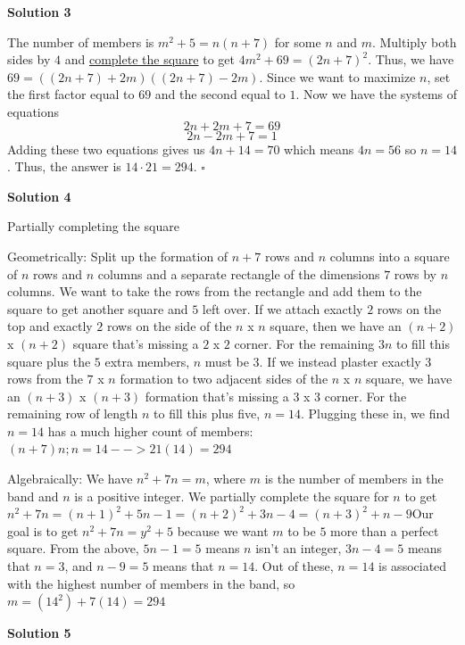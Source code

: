 \begin{enumerate}
 



\textbf{Solution 3}

The number of members is $m^2+5=n(n+7)$ for some $n$ and $m$. Multiply both sides by $4$ and \href{https://artofproblemsolving.com/wiki/index.php?title=Completing\_the\_square}{complete the square} to get $4m^2+69=(2n+7)^2$. Thus, we have $69=((2n+7)+2m)((2n+7)-2m)$. Since we want to maximize $n$, set the first factor equal to $69$ and the second equal to $1$. Now we have the systems of equations 
 \[2n+2m+7 = 69\]
 \[2n-2m+7 = 1\]Adding these two equations gives us $4n+14=70$ which means $4n=56$ so $n=14$. Thus, the answer is $14\cdot21=294$. $\square$




\textbf{Solution 4}

Partially completing the square

 Geometrically: Split up the formation of $n + 7$ rows and $n$ columns into a square of $n$ rows and $n$ columns and a separate rectangle of the dimensions $7$ rows by $n$ columns. We want to take the rows from the rectangle and add them to the square to get another square and $5$ left over. If we attach exactly $2$ rows on the top and exactly $2$ rows on the side of the $n$ x $n$ square, then we have an $(n + 2)$ x $(n + 2)$ square that's missing a $2$ x $2$ corner. For the remaining $3n$ to fill this square plus the $5$ extra members, $n$ must be $3$. If we instead plaster exactly $3$ rows from the $7$ x $n$ formation to two adjacent sides of the $n$ x $n$ square, we have an $(n + 3)$ x $(n + 3)$ formation that's missing a $3$ x $3$ corner. For the remaining row of length $n$ to fill this plus five, $n = 14$. Plugging these in, we find $n = 14$ has a much higher count of members: $(n + 7)n; n = 14 --> 21(14) = 294$

 Algebraically: We have $n^2 + 7n = m$, where $m$ is the number of members in the band and $n$ is a positive integer. We partially complete the square for $n$ to get $n^2 + 7n = (n + 1)^2 + 5n - 1 = (n + 2)^2 + 3n - 4 = (n + 3)^2 + n - 9$Our goal is to get $n^2 + 7n = y^2 + 5$ because we want $m$ to be $5$ more than a perfect square. From the above, $5n - 1 = 5$ means $n$ isn't an integer, $3n - 4 = 5$ means that $n = 3$, and $n - 9 = 5$ means that $n = 14$. Out of these, $n = 14$ is associated with the highest number of members in the band, so $m = (14^2) + 7(14) = 294$




\textbf{Solution 5}


\end{enumerate}
